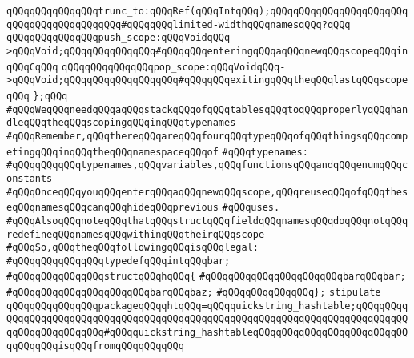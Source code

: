 \verb|qQQqqQQqqQQqqQQqtrunc_to:qQQqRef(qQQqIntqQQq);qQQqqQQqqQQqqQQqqQQqqQQqqQQqqQQqqQQqqQQqqQQq#qQQqqQQqlimited-widthqQQqnamesqQQq?qQQq|\newline
\verb|qQQqqQQqqQQqqQQqpush_scope:qQQqVoidqQQq->qQQqVoid;qQQqqQQqqQQqqQQq#qQQqqQQqenteringqQQqaqQQqnewqQQqscopeqQQqinqQQqCqQQq|\newline
\verb|qQQqqQQqqQQqqQQqpop_scope:qQQqVoidqQQq->qQQqVoid;qQQqqQQqqQQqqQQqqQQq#qQQqqQQqexitingqQQqtheqQQqlastqQQqscopeqQQq|\newline
\verb|};qQQq|\newline
\newline
\newline
\newline
\verb|#qQQqWeqQQqneedqQQqaqQQqstackqQQqofqQQqtablesqQQqtoqQQqproperlyqQQqhandleqQQqtheqQQqscopingqQQqinqQQqtypenames|\newline
\verb|#qQQqRemember,qQQqthereqQQqareqQQqfourqQQqtypeqQQqofqQQqthingsqQQqcompetingqQQqinqQQqtheqQQqnamespaceqQQqof|\newline
\verb|#qQQqtypenames:|\newline
\verb|#qQQqqQQqqQQqtypenames,qQQqvariables,qQQqfunctionsqQQqandqQQqenumqQQqconstants|\newline
\verb|#qQQqOnceqQQqyouqQQqenterqQQqaqQQqnewqQQqscope,qQQqreuseqQQqofqQQqtheseqQQqnamesqQQqcanqQQqhideqQQqprevious|\newline
\verb|#qQQquses.|\newline
\verb|#qQQqAlsoqQQqnoteqQQqthatqQQqstructqQQqfieldqQQqnamesqQQqdoqQQqnotqQQqredefineqQQqnamesqQQqwithinqQQqtheirqQQqscope|\newline
\verb|#qQQqSo,qQQqtheqQQqfollowingqQQqisqQQqlegal:|\newline
\verb|#qQQqqQQqqQQqqQQqtypedefqQQqintqQQqbar;|\newline
\verb|#qQQqqQQqqQQqqQQqstructqQQqhqQQq{|\newline
\verb|#qQQqqQQqqQQqqQQqqQQqqQQqbarqQQqbar;|\newline
\verb|#qQQqqQQqqQQqqQQqqQQqqQQqbarqQQqbaz;|\newline
\verb|#qQQqqQQqqQQqqQQq};|\newline
\newline
\newline
\newline
\verb|stipulate|\newline
\verb|qQQqqQQqqQQqqQQqpackageqQQqqhtqQQq=qQQqquickstring_hashtable;qQQqqQQqqQQqqQQqqQQqqQQqqQQqqQQqqQQqqQQqqQQqqQQqqQQqqQQqqQQqqQQqqQQqqQQqqQQqqQQqqQQqqQQqqQQqqQQq#qQQqquickstring_hashtableqQQqqQQqqQQqqQQqqQQqqQQqqQQqqQQqqQQqisqQQqfromqQQqqQQqqQQq|\newline
